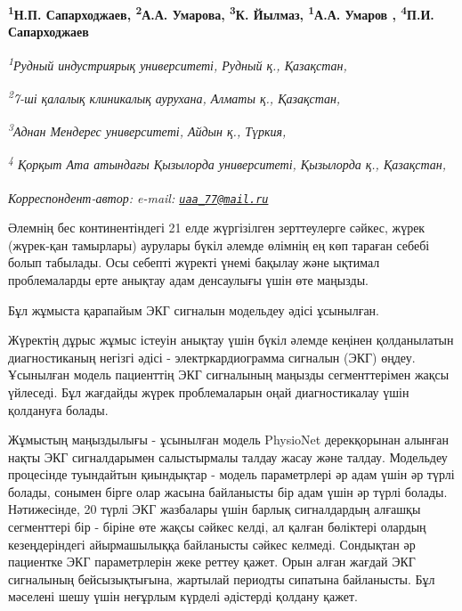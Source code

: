 
\begin{articleheader}

{\bfseries
\textsuperscript{1}Н.П. Сапарходжаев,
\textsuperscript{2}А.А. Умарова,
\textsuperscript{3}К. Йылмаз,
\textsuperscript{1}А.А. Умаров\textsuperscript{\envelope } ,
\textsuperscript{4}П.И. Сапарходжаев}
\end{articleheader}

\begin{affiliation}
\emph{\textsuperscript{1}Рудный индустриярық университеті, Рудный қ., Қазақстан,}

\emph{\textsuperscript{2}7-ші қалалық клиникалық аурухана, Алматы қ., Қазақстан,}

\emph{\textsuperscript{3}Аднан Мендерес университеті, Айдын қ., Түркия,}

\emph{\textsuperscript{4} Қорқыт Ата атындағы Қызылорда университеті, Қызылорда қ., Қазақстан,}

\raggedright \textsuperscript{\envelope }{\em Корреспондент-автор: e-mail: \href{mailto:uaa_77@mail.ru}{\nolinkurl{uaa\_77@mail.ru}}}
\end{affiliation}

Әлемнің бес континентіндегі 21 елде жүргізілген зерттеулерге сәйкес,
жүрек (жүрек-қан тамырлары) аурулары бүкіл әлемде өлімнің ең көп тараған
себебі болып табылады. Осы себепті жүректі үнемі бақылау және ықтимал
проблемаларды ерте анықтау адам денсаулығы үшін өте маңызды.

Бұл жұмыста қарапайым ЭКГ сигналын модельдеу әдісі ұсынылған.

Жүректің дұрыс жұмыс істеуін анықтау үшін бүкіл әлемде кеңінен
қолданылатын диагностиканың негізгі әдісі - электркардиограмма сигналын
(ЭКГ) өңдеу. Ұсынылған модель пациенттің ЭКГ сигналының маңызды
сегменттерімен жақсы үйлеседі. Бұл жағдайды жүрек проблемаларын оңай
диагностикалау үшін қолдануға болады.

Жұмыстың маңыздылығы - ұсынылған модель PhysioNet дерекқорынан алынған
нақты ЭКГ сигналдарымен салыстырмалы талдау жасау және талдау. Модельдеу
процесінде туындайтын қиындықтар - модель параметрлері әр адам үшін әр
түрлі болады, сонымен бірге олар жасына байланысты бір адам үшін әр
түрлі болады. Нәтижесінде, 20 түрлі ЭКГ жазбалары үшін барлық
сигналдардың алғашқы сегменттері бір - біріне өте жақсы сәйкес келді, ал
қалған бөліктері олардың кезеңдеріндегі айырмашылыққа байланысты сәйкес
келмеді. Сондықтан әр пациентке ЭКГ параметрлерін жеке реттеу қажет.
Орын алған жағдай ЭКГ сигналының бейсызықтығына, жартылай периодты
сипатына байланысты. Бұл мәселені шешу үшін неғұрлым күрделі әдістерді
қолдану қажет.

